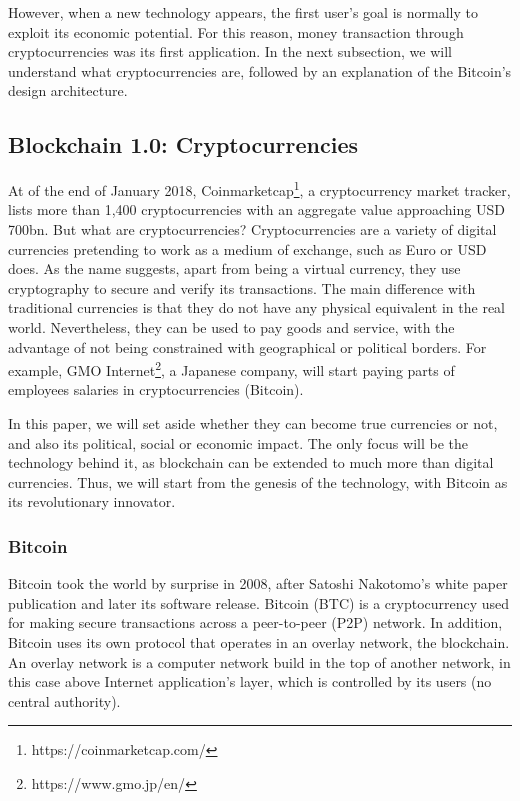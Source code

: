 However, when a new technology appears, the first user's goal is normally to exploit its economic potential. For this reason, money transaction through cryptocurrencies was its first application. In the next subsection, we will understand what cryptocurrencies are, followed by an explanation of the Bitcoin's design architecture.

\subsection{Blockchain 1.0: Cryptocurrencies}

At of the end of January 2018, Coinmarketcap\footnote{https://coinmarketcap.com/}, a cryptocurrency market tracker, lists more than 1,400 cryptocurrencies with an aggregate value approaching USD 700bn. But what are cryptocurrencies? Cryptocurrencies are a variety of digital currencies pretending to work as a medium of exchange, such as Euro or USD does. As the name suggests, apart from being a virtual currency, they use cryptography to secure and verify its transactions. The main difference with traditional currencies is that they do not have any physical equivalent in the real world. Nevertheless, they can be used to pay goods and service, with the advantage of not being constrained with geographical or political borders. For example, GMO Internet\footnote{https://www.gmo.jp/en/}, a Japanese company, will start paying parts of employees salaries in cryptocurrencies (Bitcoin).

In this paper, we will set aside whether they can become true currencies or not, and also its political, social or economic impact. The only focus will be the technology behind it, as blockchain can be extended to much more than digital currencies. Thus, we will start from the genesis of the technology, with Bitcoin as its revolutionary innovator.


\subsubsection{Bitcoin}

Bitcoin took the world by surprise in 2008, after Satoshi Nakotomo's white paper publication \cite{nakamoto2008bitcoin} and later its software release. Bitcoin (BTC) is a cryptocurrency used for making secure transactions across a peer-to-peer (P2P) network. In addition, Bitcoin uses its own protocol that operates in an overlay network, the blockchain. An overlay network is a computer network build in the top of another network, in this case above Internet application's layer, which is controlled by its users (no central authority).

